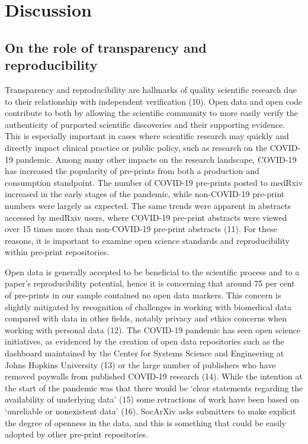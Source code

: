 \documentclass[
]{article}
\begin{document}
\hypertarget{discussion}{%
\section{Discussion}\label{discussion}}

\hypertarget{on-the-role-of-transparency-and-reproducibility}{%
\subsection{On the role of transparency and reproducibility}\label{on-the-role-of-transparency-and-reproducibility}}

Transparency and reproducibility are hallmarks of quality scientific research due to their relationship with independent verification (10). Open data and open code contribute to both by allowing the scientific community to more easily verify the authenticity of purported scientific discoveries and their supporting evidence. This is especially important in cases where scientific research may quickly and directly impact clinical practice or public policy, such as research on the COVID-19 pandemic. Among many other impacts on the research landscape, COVID-19 has increased the popularity of pre-prints from both a production and consumption standpoint. The number of COVID-19 pre-prints posted to medRxiv increased in the early stages of the pandemic, while non-COVID-19 pre-print numbers were largely as expected. The same trends were apparent in abstracts accessed by medRxiv users, where COVID-19 pre-print abstracts were viewed over 15 times more than non-COVID-19 pre-print abstracts (11). For these reasons, it is important to examine open science standards and reproducibility within pre-print repositories.

Open data is generally accepted to be beneficial to the scientific process and to a paper's reproducibility potential, hence it is concerning that around 75 per cent of pre-prints in our sample contained no open data markers. This concern is slightly mitigated by recognition of challenges in working with biomedical data compared with data in other fields, notably privacy and ethics concerns when working with personal data (12). The COVID-19 pandemic has seen open science initiatives, as evidenced by the creation of open data repositories such as the dashboard maintained by the Center for Systems Science and Engineering at Johns Hopkins University (13) or the large number of publishers who have removed paywalls from published COVID-19 research (14). While the intention at the start of the pandemic was that there would be `clear statements regarding the availability of underlying data' (15) some retractions of work have been based on `unreliable or nonexistent data' (16). SocArXiv asks submitters to make explicit the degree of openness in the data, and this is something that could be easily adopted by other pre-print repositories.
\end{document}

